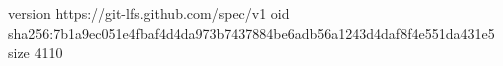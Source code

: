 version https://git-lfs.github.com/spec/v1
oid sha256:7b1a9ec051e4fbaf4d4da973b7437884be6adb56a1243d4daf8f4e551da431e5
size 4110
